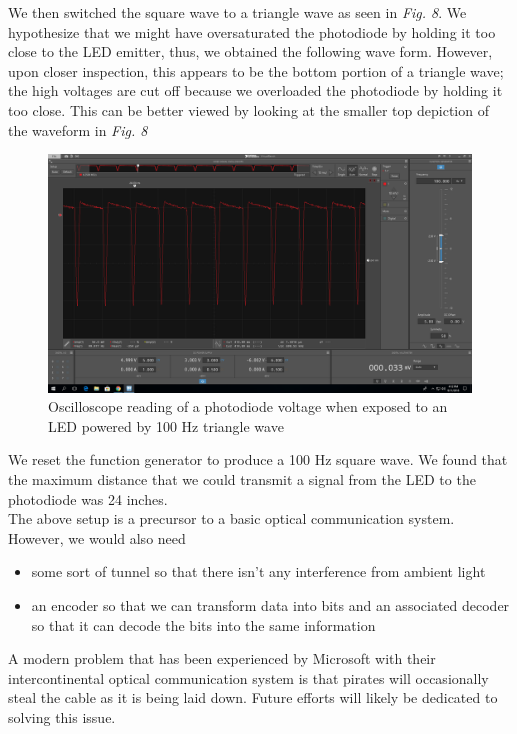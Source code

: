 \documentclass[10pt]{article}
\begin{document}
We then switched the square wave to a triangle wave as seen in \textit{Fig. 8}. We hypothesize that we might have oversaturated the photodiode by holding it too close to the LED emitter, thus, we obtained the following wave form. However, upon closer inspection, this appears to be the bottom portion of a triangle wave; the high voltages are cut off because we overloaded the photodiode by holding it too close. This can be better viewed by looking at the smaller top depiction of the waveform in \textit{Fig. 8}
\begin{center}
	\begin{figure} [H]
		\centering
		\includegraphics[scale=0.22]{images/opticaltriangle.png}
		\caption{Oscilloscope reading of a photodiode voltage when exposed to an LED powered by 100 Hz triangle wave}
	\end{figure}
\end{center}

We reset the function generator to produce a 100 Hz square wave. We found that the maximum distance that we could transmit a signal from the LED to the photodiode was 24 inches. \\
The above setup is a precursor to a basic optical communication system. However, we would also need 
\begin{itemize}
	\item some sort of tunnel so that there isn't any interference from ambient light
	\item an encoder so that we can transform data into bits and an associated decoder so that it can decode the bits into the same information
\end{itemize}
A modern problem that has been experienced by Microsoft with their intercontinental optical communication system is that pirates will occasionally steal the cable as it is being laid down. Future efforts will likely be dedicated to solving this issue. 
\medskip
\end{document}
